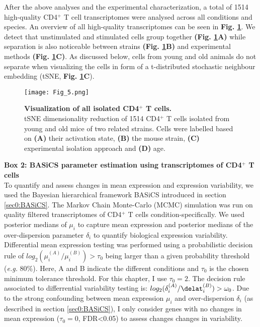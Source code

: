 \captionsetup[figure]{list=yes}

After the above analyses and the experimental characterization, a total of 1514 high-quality CD4$^+$ T cell transcriptomes were analysed across all conditions and species. An overview of all high-quality transcriptomes can be seen in \textbf{Fig. \ref{fig1:all_cells}}. We detect that unstimulated and stimulated cells group together \textbf{(Fig. \ref{fig1:all_cells}A)} while separation is also noticeable between strains \textbf{(Fig. \ref{fig1:all_cells}B)} and experimental methods \textbf{(Fig. \ref{fig1:all_cells}C)}. As discussed below, cells from young and old animals do not separate when visualizing the cells in form of a t-distributed stochastic neighbour embedding (tSNE, \textbf{Fig. \ref{fig1:all_cells}C}). 

\newpage

\begin{figure}[!hb]
\centering
\texttt{[image: Fig\_5.png]}
\caption[Visualization of all isolated CD4$^+$ T cells]{\textbf{Visualization of all isolated CD4$^+$ T cells.}\\
tSNE dimensionality reduction of 1514 CD4$^+$ T cells isolated from young and old mice of two related strains. Cells were labelled based on \textbf{(A)} their activation state, \textbf{(B)} the mouse strain, \textbf{(C)} experimental isolation approach and \textbf{(D)} age.}
\label{fig1:all_cells}
\end{figure}

\begin{Comment}
\textbf{Box 2: BASiCS parameter estimation using transcriptomes of CD4$^+$ T cells}\\
To quantify and assess changes in mean expression and expression variability, we used the Bayesian hierarchical framework BASiCS introduced in section \ref{sec0:BASiCS}. The Markov Chain Monte-Carlo (MCMC) simulation was run on quality filtered transcriptomes of CD4$^+$ T cells condition-specifically. We used posterior medians of $\mu_i$ to capture mean expression and posterior medians of the over-dispersion parameter $\delta_i$ to quantify biological expression variability. \\
Differential mean expression testing was performed using a probabilistic decision rule of $log_2(\mu_i^{(A)}/\mu_i^{(B)})>\tau_0$ being larger than a given probability threshold (\emph{e.g.} 80\%). Here, A and B indicate the different conditions and $\tau_0$ is the chosen minimum tolerance threshold. For this chapter, I use $\tau_0=2$. The decision rule associated to differrential variability testing is: $log_2(\delta_i^{(A)}/\delat_i^{(B)})>\omega_0$. Due to the strong confounding between mean expression $\mu_i$ and over-dispersion $\delta_i$ (as described in section \ref{sec0:BASiCS}), I only consider genes with no changes in mean expression ($\tau_0=0$, FDR<0.05) to assess changes changes in variability.  
\end{Comment}

